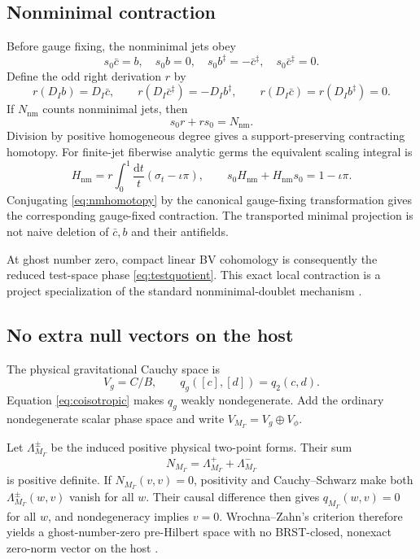 \documentclass[11pt]{article}
\theoremstyle{definition}
\theoremstyle{remark}
\newcommand{\M}{M_{\Gamma}}
\newcommand{\cbar}{\bar c}
\newcommand{\dd}{\mathrm d}
\begin{document}
\subsection{Nonminimal contraction}

Before gauge fixing, the nonminimal jets obey
\begin{equation}
 s_0\cbar=b,
 \quad s_0b=0,
 \quad s_0b^\ddagger=-\cbar^\ddagger,
 \quad s_0\cbar^\ddagger=0.
\end{equation}
Define the odd right derivation $r$ by
\begin{equation}
 r(D_Ib)=D_I\cbar,
 \qquad r(D_I\cbar^\ddagger)=-D_Ib^\ddagger,
 \qquad r(D_I\cbar)=r(D_Ib^\ddagger)=0.
\end{equation}
If $N_{\mathrm{nm}}$ counts nonminimal jets, then
\begin{equation}
 s_0r+rs_0=N_{\mathrm{nm}}.
\end{equation}
Division by positive homogeneous degree gives a support-preserving contracting homotopy.
For finite-jet fiberwise analytic germs the equivalent scaling integral is
\begin{equation}
 H_{\mathrm{nm}}=r\int_0^1\frac{\dd t}{t}
 (\sigma_t-\iota\pi),
 \qquad
 s_0H_{\mathrm{nm}}+H_{\mathrm{nm}}s_0=1-\iota\pi.
 \label{eq:nmhomotopy}
\end{equation}
Conjugating \cref{eq:nmhomotopy} by the canonical gauge-fixing transformation gives
the corresponding gauge-fixed contraction.  The transported minimal projection is
not naive deletion of $\cbar,b$ and their antifields.

At ghost number zero, compact linear BV cohomology is consequently the reduced
test-space phase \cref{eq:testquotient}.  This exact local contraction is a project
specialization of the standard nonminimal-doublet mechanism
\cite{BarnichBrandtHenneaux2000}.

\subsection{No extra null vectors on the host}

The physical gravitational Cauchy space is
\begin{equation}
 V_g=C/B,
 \qquad q_g([c],[d])=q_2(c,d).
\end{equation}
Equation \cref{eq:coisotropic} makes $q_g$ weakly nondegenerate.  Add the ordinary
nondegenerate scalar phase space and write $V_{\M}=V_g\oplus V_\phi$.

Let $\Lambda_{\M}^\pm$ be the induced positive physical two-point forms.  Their sum
\begin{equation}
 N_{\M}=\Lambda_{\M}^++\Lambda_{\M}^-
\end{equation}
is positive definite.  If $N_{\M}(v,v)=0$, positivity and Cauchy--Schwarz make both
$\Lambda_{\M}^\pm(w,v)$ vanish for all $w$.  Their causal difference then gives
$q_{\M}(w,v)=0$ for all $w$, and nondegeneracy implies $v=0$.  Wrochna--Zahn's
criterion therefore yields a ghost-number-zero pre-Hilbert space with no BRST-closed,
nonexact zero-norm vector on the host \cite{WrochnaZahn2015}.
\end{document}

